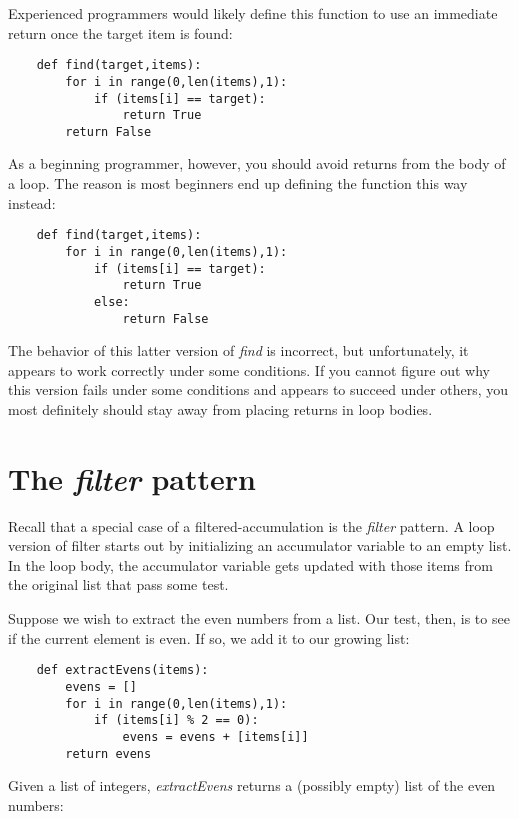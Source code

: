 Experienced programmers would likely define this function
to use an immediate return once the target item is found:

\begin{verbatim}
    def find(target,items):
        for i in range(0,len(items),1):
            if (items[i] == target):
                return True
        return False
\end{verbatim}

As a beginning programmer, however, you should avoid returns
from the body of a loop. The reason is most beginners end up
defining the function this way instead:

\begin{verbatim}
    def find(target,items):
        for i in range(0,len(items),1):
            if (items[i] == target):
                return True
            else:
                return False
\end{verbatim}

The behavior of this latter version of {\it find} is incorrect,
but unfortunately, it appears to work correctly under some
conditions. If you cannot figure out why this version
fails under some conditions and appears to succeed under
others, you most definitely should stay away from placing
returns in loop bodies.
        
\section{The {\it filter} pattern}

Recall that a special case of a filtered-accumulation is the {\it filter}
pattern.
A loop version  of filter starts out by initializing an accumulator variable to
an empty list. In the loop body, the accumulator variable
gets updated with those items from the original list that 
pass some test.

Suppose we wish to extract the even numbers from a list.
Our test, then, is to see if the current element is even.
If so, we add it to our growing list:

\begin{verbatim}
    def extractEvens(items):
        evens = []
        for i in range(0,len(items),1):
            if (items[i] % 2 == 0):
                evens = evens + [items[i]]
        return evens
\end{verbatim}

Given a list of integers, {\it extractEvens} returns a (possibly empty)
list of the even numbers:

